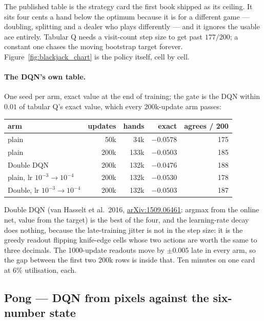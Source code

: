 \noindent The published table is the strategy card the first book shipped as
its ceiling. It sits four cents a hand below the optimum
because it is for a different game --- doubling, splitting and a dealer who
plays differently --- and it ignores the usable ace entirely. Tabular Q needs
a visit-count step size to get past $177/200$; a constant one chases the
moving bootstrap target forever. Figure~\ref{fig:blackjack_chart} is the
policy itself, cell by cell.


\paragraph{The DQN's own table.} One seed per arm, exact value at the end of
training; the gate is the DQN within $0.01$ of tabular Q's exact value, which
every 200k-update arm passes:

\begin{center}
\begin{tabular}{@{}l r r r r@{}}
\hline
arm & updates & hands & exact & agrees / 200 \\
\hline
plain                          &  50k &  34k & $-0.0578$ & 175 \\
plain                          & 200k & 133k & $-0.0503$ & 185 \\
Double DQN                     & 200k & 132k & $-0.0476$ & 188 \\
plain, lr $10^{-3} \to 10^{-4}$ & 200k & 132k & $-0.0530$ & 178 \\
Double, lr $10^{-3} \to 10^{-4}$ & 200k & 132k & $-0.0503$ & 187 \\
\hline
\end{tabular}
\end{center}

\noindent Double DQN (van Hasselt et al.\ 2016,
\href{https://arxiv.org/abs/1509.06461}{arXiv:1509.06461}: argmax from the
online net, value from the target) is the best of the four, and the
learning-rate decay does nothing, because the late-training jitter is not in
the step size: it is the greedy readout flipping knife-edge cells whose two
actions are worth the same to three decimals. The 1000-update readouts move by
$\pm 0.005$ late in every arm, so the gap between the first two 200k rows is
inside that. Ten minutes on one card at 6\% utilisation, each.

\subsection{Pong --- DQN from pixels against the six-number state}
\label{sec:game_pong}

